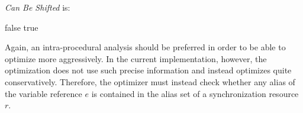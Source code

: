 \textit{Can Be Shifted} is:
\begin{algorithmic}
\State {}
    \State \Return false
  \EndIf
\EndFor
\State \Return true
\EndFunction
\end{algorithmic}
Again, an intra-procedural analysis should be preferred in order to be able to optimize more aggressively. In the current implementation, however, the optimization does not use such precise information and instead optimizes quite conservatively. Therefore, the optimizer must instead check whether any alias of the variable reference $e$ is contained in the alias set of a synchronization resource $r$.



